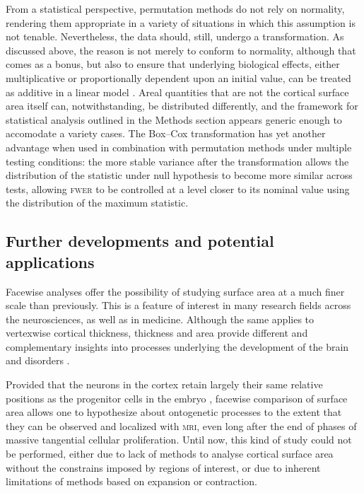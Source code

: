 From a statistical perspective, permutation methods do not rely on normality, rendering them appropriate in a variety of situations in which this assumption is not tenable. Nevertheless, the data should, still, undergo a transformation. As discussed above, the reason is not merely to conform to normality, although that comes as a bonus, but also to ensure that underlying biological effects, either multiplicative or proportionally dependent upon an initial value, can be treated as additive in a linear model \citep{Christensen2002}. Areal quantities that are not the cortical surface area itself can, notwithstanding, be distributed differently, and the framework for statistical analysis outlined in the Methods section appears generic enough to accomodate a variety cases. The Box--Cox transformation has yet another advantage when used in combination with permutation methods under multiple testing conditions: the more stable variance after the transformation allows the distribution of the statistic under null hypothesis to become more similar across tests, allowing \textsc{fwer} to be controlled at a level closer to its nominal value using the distribution of the maximum statistic.

\subsection{Further developments and potential applications}

Facewise analyses offer the possibility of studying surface area at a much finer scale than previously. This is a feature of interest in many research fields across the neurosciences, as well as in medicine. Although the same applies to vertexwise cortical thickness, thickness and area provide different and complementary insights into processes underlying the development of the brain and disorders \citep{Voets2008, Winkler2010, SanabriaDiaz2010}.

Provided that the neurons in the cortex retain largely their same relative positions as the progenitor cells in the embryo \citep{Rakic1988, Rakic2009a, Pierani2009, Clowry2010}, facewise comparison of surface area allows one to hypothesize about ontogenetic processes to the extent that they can be observed and localized with \textsc{mri}, even long after the end of phases of massive tangential cellular proliferation. Until now, this kind of study could not be performed, either due to lack of methods to analyse cortical surface area without the constrains imposed by regions of interest, or due to inherent limitations of methods based on expansion or contraction.

